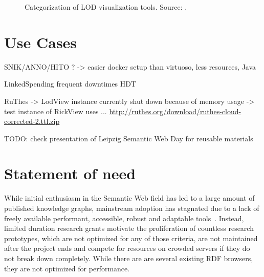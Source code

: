 \documentclass{ceurart}
\begin{document}


\begin{figure}
\centering
\caption{Categorization of LOD visualization tools. Source: \cite{adaptinglodview}.}
\label{fig:relatedwork}
\end{figure}

\section{Use Cases}
SNIK/ANNO/HITO ?
-> easier docker setup than virtuoso, less resources, Java 

LinkedSpending
frequent downtimes
HDT

RuThes
-> LodView instance currently shut down because of memory usage
-> test instance of RickView uses ...
\url{http://ruthes.org/download/ruthes-cloud-corrected-2.ttl.zip}

TODO: check presentation of Leipzig Semantic Web Day for reusable materials

\section{Statement of need}\label{statement-of-need}

While initial enthusiasm in the Semantic Web field has led to a large amount of published knowledge graphs, mainstream adoption has stagnated due to a lack of freely available performant, accessible, robust and adaptable tools~\citep{semanticwebreview}.
Instead, limited duration research grants motivate the proliferation of countless research prototypes, which are not optimized for any of those criteria, are not maintained after the project ends and compete for resources on crowded servers if they do not break down completely.
While there are are several existing RDF browsers, they are not optimized for performance.
\end{document}
